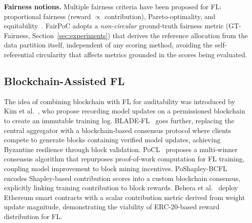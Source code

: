 \documentclass[journal]{IEEEtran}
\theoremstyle{definition}
\theoremstyle{remark}
\begin{document}
\textbf{Fairness notions.}
Multiple fairness criteria have been proposed for FL:
proportional fairness (reward $\propto$ contribution),
Pareto-optimality, and equitability~\cite{song2019profit}.
FairPoC adopts a \emph{non-circular} ground-truth fairness metric
(GT-Fairness, Section~\ref{sec:experiments}) that derives the
reference allocation from the data partition itself, independent
of any scoring method, avoiding the self-referential circularity
that affects metrics grounded in the scores being evaluated.

\subsection{Blockchain-Assisted FL}

The idea of combining blockchain with FL for auditability was
introduced by Kim et al.~\cite{kim2019blockchained}, who propose
recording model updates on a permissioned blockchain to create
an immutable training log.
BLADE-FL~\cite{bladefl2022} goes further, replacing the central
aggregator with a blockchain-based consensus protocol where
clients compete to generate blocks containing verified model
updates, achieving Byzantine resilience through block validation.
PoCL~\cite{pocl2024} proposes a multi-winner consensus algorithm
that repurposes proof-of-work computation for FL training,
coupling model improvement to block mining incentives.
PoShapley-BCFL~\cite{poshapley2023} encodes Shapley-based
contribution scores into a custom blockchain consensus, explicitly
linking training contribution to block rewards.
Behera et al.~\cite{behera2021federated} deploy Ethereum smart
contracts with a scalar contribution metric derived from weight
update magnitude, demonstrating the viability of ERC-20-based
reward distribution for FL.
\end{document}
